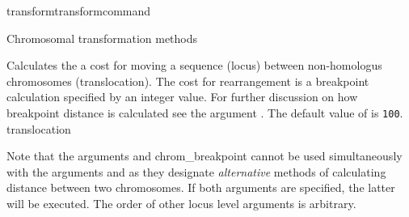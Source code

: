 \begin{command}{transform}{transformcommand}
\begin{arguments}
\begin{argumentgroup}{Chromosomal transformation methods}
\begin{description}


      		     {Calculates the a cost for moving a sequence (locus) between non-homologus chromosomes (translocation).
                         The cost for rearrangement is a breakpoint calculation specified by an integer value. For further discussion on 
                        how breakpoint distance is calculated see the argument .  
                        The default value of  is \texttt{100}.} 
                        {translocation}

       
                   \begin{statement}
  		Note that the arguments  and \poyargument 
		{chrom\_breakpoint} cannot be used simultaneously with the arguments 
		 and 
		as they designate \emph{alternative} methods of calculating distance between two chromosomes.
		If both arguments are specified, the latter will be executed. The order of other locus level arguments
		is arbitrary. 
		\end{statement}


\end{description}
\end{argumentgroup}
\end{arguments}
\end{command}
